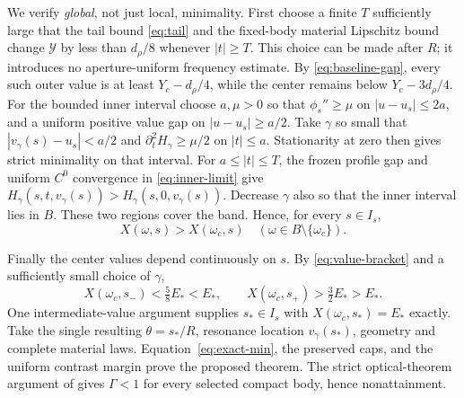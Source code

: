\documentclass[11pt]{article}
\newcommand{\abs}[1]{\left|#1\right|}
\begin{document}
We verify \emph{global}, not just local, minimality.
First choose a finite $T$ sufficiently large that the tail bound
\eqref{eq:tail} and the fixed-body material Lipschitz bound change
$\mathcal Y$ by less than $d_\rho/8$ whenever $\abs t\ge T$.
This choice can be made after $R$; it introduces no aperture-uniform
frequency estimate. By \eqref{eq:baseline-gap}, every such outer value is at
least $Y_c-d_\rho/4$, while the center remains below $Y_c-3d_\rho/4$.
For the bounded inner interval choose $a,\mu>0$ so that
$\phi_s''\ge\mu$ on $\abs{u-u_s}\le2a$, and a uniform positive value gap
on $\abs{u-u_s}\ge a/2$. Take $\gamma$ so small that
$\abs{v_\gamma(s)-u_s}<a/2$ and
$\partial_t^2H_\gamma\ge\mu/2$ on $\abs t\le a$.
Stationarity at zero then gives strict minimality on that interval.
For $a\le\abs t\le T$, the frozen profile gap and uniform $C^0$ convergence
in \eqref{eq:inner-limit} give $H_\gamma(s,t,v_\gamma(s))>
H_\gamma(s,0,v_\gamma(s))$.
Decrease $\gamma$ also so that the inner interval lies in $B$.
These two regions cover the band. Hence, for every $s\in I_s$,
\begin{equation}\label{eq:exact-min}
 X(\omega,s)>X(\omega_c,s)\quad
      (\omega\in B\setminus\{\omega_c\}).
\end{equation}

Finally the center values depend continuously on $s$. By
\eqref{eq:value-bracket} and a sufficiently small choice of $\gamma$,
\[
 X(\omega_c,s_-)<\tfrac58E_*<E_*,
 \qquad
 X(\omega_c,s_+)>\tfrac32E_*>E_*.
\]
One intermediate-value argument supplies $s_*\in I_s$ with
$X(\omega_c,s_*)=E_*$ exactly.
Take the single resulting $\theta=s_*/R$, resonance location
$v_\gamma(s_*)$, geometry and complete material laws.
Equation~\eqref{eq:exact-min}, the preserved caps, and the uniform contrast
margin prove the proposed theorem.
The strict optical-theorem argument of \cite{base} gives $\Gamma<1$ for every
selected compact body, hence nonattainment.
\end{document}
